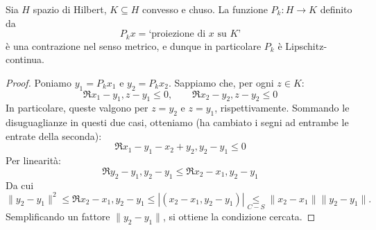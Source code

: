 \begin{lemma}
\label{lemma:hilb_seven}
	Sia $H$ spazio di Hilbert, $K \subseteq H$ convesso e chuso.
	La funzione $P_k : H \to K$ definito da
	\begin{equation*}
		P_kx = \text{`proiezione di $x$ su $K$'}
	\end{equation*}
	è una contrazione nel senso metrico, e dunque in particolare $P_k$ è Lipschitz-continua.
\end{lemma}
\begin{proof}
	Poniamo $y_1 = P_kx_1$ e $y_2 = P_k x_2$. Sappiamo che, per ogni $z \in K$:
	\begin{equation*}
		\Re{x_1 -y_1, z-y_1} \leq 0, \qquad \Re{x_2 -y_2, z-y_2} \leq 0
	\end{equation*}
	In particolare, queste valgono per $z=y_2$ e $z=y_1$, rispettivamente. Sommando le disuguaglianze in questi due casi, otteniamo (ha cambiato i segni ad entrambe le entrate della seconda):
	\begin{equation*}
		\Re{x_1-y_1-x_2+y_2, y_2-y_1} \leq 0
	\end{equation*}
	Per linearità:
	\begin{equation*}
		\Re{y_2-y_1, y_2-y_1} \leq \Re{x_2-x_1, y_2-y_1}
	\end{equation*}
	Da cui
	\begin{equation*}
		\|y_2-y_1\|^2 \leq \Re{x_2-x_1, y_2-y_1} \leq |(x_2-x_1, y_2-y_1)| \underset{C-S}\leq \|x_2-x_1\|\|y_2-y_1\|.
	\end{equation*}
	Semplificando un fattore $\|y_2-y_1\|$, si ottiene la condizione cercata.
\end{proof}

